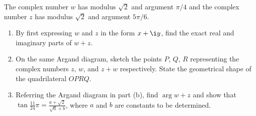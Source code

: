 \begin{problem}
    The complex number $w$ has modulus $\sqrt2$ and argument $\pi/4$ and the complex number $z$ has modulus $\sqrt2$ and argument $5\pi/6$.

    \begin{enumerate}
        \item By first expressing $w$ and $z$ in the form $x + \i y$, find the exact real and imaginary parts of $w + z$.
        \item On the same Argand diagram, sketch the points $P$, $Q$, $R$ representing the complex numbers $z$, $w$, and $z + w$ respectively. State the geometrical shape of the quadrilateral $OPRQ$.
        \item Referring the Argand diagram in part (b), find $\arg{w + z}$ and show that $\tan \frac{11}{24}\pi = \frac{a + \sqrt2}{\sqrt6 + b}$, where $a$ and $b$ are constants to be determined.
    \end{enumerate}
\end{problem}
\clearpage
